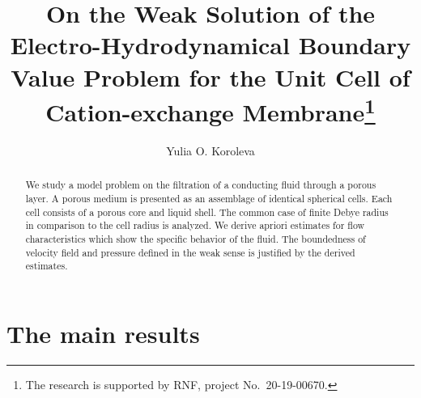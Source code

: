 \documentclass[12pt]{llncs}
\begin{document}
%
\fi

\title{On the Weak Solution of the Electro-Hydrodynamical Boundary Value Problem for the Unit Cell of Cation-exchange Membrane\thanks{The research is supported by RNF, project No.~20-19-00670.}}
\author{Yulia O. Koroleva 
}

\maketitle

\begin{abstract}
We study a model problem on the filtration of a conducting fluid through a porous layer. A porous medium is presented as an
assemblage of identical spherical cells. Each cell consists of a porous core and liquid shell.
The common case of finite Debye radius in comparison to the cell radius is analyzed. We derive apriori estimates for flow characteristics which show the specific behavior of the fluid. The boundedness of velocity field and pressure defined in the weak sense is justified by the derived estimates.

\end{abstract}

\section{The main results}
\end{document}
